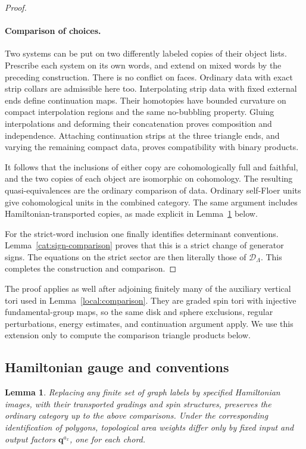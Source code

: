 \documentclass[11pt]{article}
\newtheorem{lemma}[theorem]{Lemma}
\theoremstyle{definition}
\theoremstyle{remark}
\numberwithin{equation}{section}
\begin{document}
\begin{proof}
\paragraph{Comparison of choices.}
Two systems can be put on two differently labeled copies of their
object lists.  Prescribe each system on its own words, and extend on
mixed words by the preceding construction.  There is no conflict on
faces.  Ordinary data with exact strip collars are admissible here too.
Interpolating strip data with fixed external ends define continuation
maps.  Their homotopies have bounded curvature on compact interpolation
regions and the same no-bubbling property.  Gluing interpolations and
deforming their concatenation proves composition and independence.
Attaching continuation strips at the three triangle ends, and varying
the remaining compact data, proves compatibility with binary products.

It follows that the inclusions of either copy are cohomologically full
and faithful, and the two copies of each object are isomorphic on
cohomology.  The resulting quasi-equivalences are the ordinary
comparison of data.  Ordinary self-Floer units give cohomological
units in the combined category.  The same argument includes
Hamiltonian-transported copies, as made explicit in
Lemma~\ref{cat:gauge} below.

For the strict-word inclusion one finally identifies determinant
conventions.  Lemma~\ref{cat:sign-comparison} proves that this is a
strict change of generator signs.  The equations on the strict
sector are then literally those of \(\mathcal D_\Lambda\).
This completes the construction and comparison.
\end{proof}

The proof applies as well after adjoining finitely many of the auxiliary
vertical tori used in Lemma~\ref{local:comparison}.  They are graded spin
tori with injective fundamental-group maps, so the same disk and sphere
exclusions, regular perturbations, energy estimates, and continuation
argument apply.  We use this extension only to compute the comparison
triangle products below.

\subsection{Hamiltonian gauge and conventions}

\begin{lemma}\label{cat:gauge}
Replacing any finite set of graph labels by specified Hamiltonian
images, with their transported gradings and spin structures, preserves
the ordinary category up to the above comparisons.  Under the
corresponding identification of polygons, topological area weights
differ only by fixed input and output factors
\(\mathbf q^{a_x}\), one for each chord.
\end{lemma}
\end{document}
